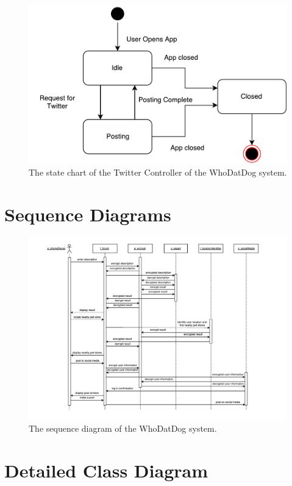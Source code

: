 \documentclass[]{article}
\begin{document}
\begin{figure}[H]
	\centering
	\includegraphics[width=\textwidth]{TwitterController.pdf}
	\caption{\label{fig:analysisclassdiagram}The state chart of the Twitter Controller of the WhoDatDog system.}
\end{figure}




\section{Sequence Diagrams}
\label{sec:sequence_diagrams}
\begin{figure}[H]
	\centering
	\includegraphics[width=\textwidth]{sequencediagram.pdf}
	\caption{\label{fig:analysisclassdiagram}The sequence diagram of the WhoDatDog system.}
\end{figure}

\section{Detailed Class Diagram}
\label{sec:detailed_class_diagram}
\end{document}
